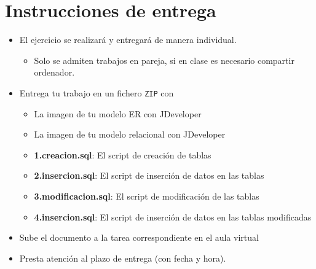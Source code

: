\section{Instrucciones de entrega}
\begin{itemize}
\item El ejercicio se realizará y entregará de manera individual.
  \begin{itemize}
  \item Solo se admiten trabajos en pareja, si en clase es necesario compartir ordenador.
  \end{itemize}
\item Entrega tu trabajo en un fichero \texttt{ZIP} con
  \begin{itemize}
  \item La imagen de tu modelo ER  con JDeveloper
  \item La imagen de tu modelo relacional con JDeveloper
  \item \textbf{1.creacion.sql}: El script de creación de tablas
  \item \textbf{2.insercion.sql}: El script de inserción de datos en las tablas
  \item \textbf{3.modificacion.sql}: El script de modificación de las tablas
  \item \textbf{4.insercion.sql}: El script de inserción de datos en las tablas modificadas
  \end{itemize}
\item Sube el documento a la tarea correspondiente en el aula virtual
\item Presta atención al plazo de entrega (con fecha y hora).
  
\end{itemize}





